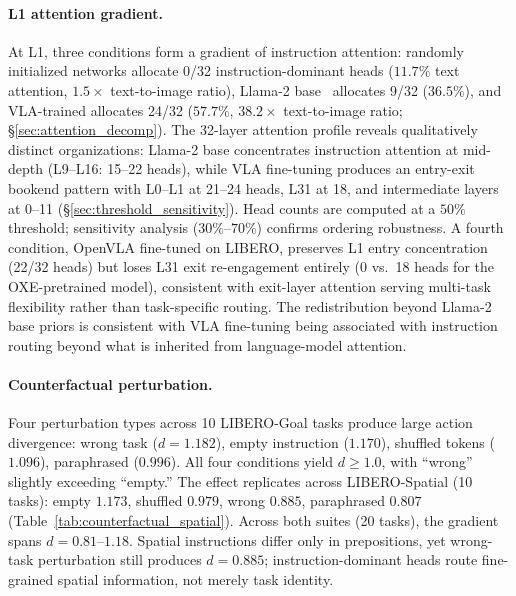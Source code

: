 \paragraph{L1 attention gradient.}
At L1, three conditions form a gradient of instruction attention: randomly initialized networks allocate 0/32 instruction-dominant heads ($11.7\%$ text attention, $1.5\times$ text-to-image ratio), Llama-2 base~\cite{touvron2023_llama2} allocates 9/32 ($36.5\%$), and VLA-trained allocates 24/32 ($57.7\%$, $38.2\times$ text-to-image ratio; \S\ref{sec:attention_decomp}).
The 32-layer attention profile reveals qualitatively distinct organizations: Llama-2 base concentrates instruction attention at mid-depth (L9--L16: 15--22 heads), while VLA fine-tuning produces an entry-exit bookend pattern with L0--L1 at 21--24 heads, L31 at 18, and intermediate layers at 0--11 (\S\ref{sec:threshold_sensitivity}).
Head counts are computed at a $50\%$ threshold; sensitivity analysis ($30\%$--$70\%$) confirms ordering robustness.
A fourth condition, OpenVLA fine-tuned on LIBERO, preserves L1 entry concentration (22/32 heads) but loses L31 exit re-engagement entirely (0 vs.\ 18 heads for the OXE-pretrained model), consistent with exit-layer attention serving multi-task flexibility rather than task-specific routing.
The redistribution beyond Llama-2 base priors is consistent with VLA fine-tuning being associated with instruction routing beyond what is inherited from language-model attention.

\paragraph{Counterfactual perturbation.}
Four perturbation types across 10 LIBERO-Goal tasks produce large action divergence: wrong task ($d = 1.182$), empty instruction ($1.170$), shuffled tokens ($1.096$), paraphrased ($0.996$).
All four conditions yield $d \geq 1.0$, with ``wrong'' slightly exceeding ``empty.''
The effect replicates across LIBERO-Spatial (10 tasks): empty $1.173$, shuffled $0.979$, wrong $0.885$, paraphrased $0.807$ (Table~\ref{tab:counterfactual_spatial}).
Across both suites (20 tasks), the gradient spans $d = 0.81$--$1.18$.
Spatial instructions differ only in prepositions, yet wrong-task perturbation still produces $d = 0.885$; instruction-dominant heads route fine-grained spatial information, not merely task identity.

